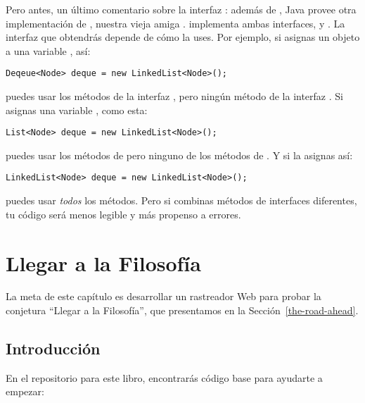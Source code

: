 \documentclass[12pt]{book}
\theoremstyle{exercise}
\begin{document}

Pero antes, un último comentario sobre la interfaz : además
de , Java provee otra implementación de
, nuestra vieja amiga . 
implementa ambas interfaces,  y . La interfaz
que obtendrás depende de cómo la uses. Por ejemplo, si asignas
un objeto  a una variable , así:

\begin{verbatim}
Deqeue<Node> deque = new LinkedList<Node>();
\end{verbatim}

puedes usar los métodos de la interfaz , pero ningún
método de la interfaz . Si asignas una variable
, como esta:

\begin{verbatim}
List<Node> deque = new LinkedList<Node>();
\end{verbatim}

puedes usar los métodos de  pero ninguno de los métodos de .
Y si la asignas así:

\begin{verbatim}
LinkedList<Node> deque = new LinkedList<Node>();
\end{verbatim}

puedes usar \emph{todos} los métodos. Pero si combinas métodos de
interfaces diferentes, tu código será menos legible y más propenso
a errores.



\chapter{Llegar a la Filosofía}
\label{getphilo}

La meta de este capítulo es desarrollar un rastreador Web para probar
la conjetura ``Llegar a la Filosofía'', que presentamos en la
Sección~\ref{the-road-ahead}.



\section{Introducción}
\label{getting-started}

En el repositorio para este libro,
encontrarás código base para ayudarte a empezar:
\end{document}
